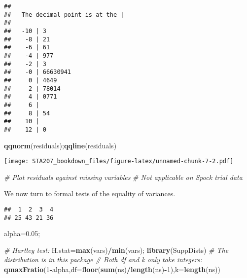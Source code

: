 \documentclass[12pt,]{book}
\newenvironment{Shaded}{\begin{snugshade}}{\end{snugshade}}
\newcommand{\KeywordTok}[1]{\textcolor[rgb]{0.13,0.29,0.53}{\textbf{#1}}}
\newcommand{\DataTypeTok}[1]{\textcolor[rgb]{0.13,0.29,0.53}{#1}}
\newcommand{\DecValTok}[1]{\textcolor[rgb]{0.00,0.00,0.81}{#1}}
\newcommand{\FloatTok}[1]{\textcolor[rgb]{0.00,0.00,0.81}{#1}}
\newcommand{\CommentTok}[1]{\textcolor[rgb]{0.56,0.35,0.01}{\textit{#1}}}
\newcommand{\OperatorTok}[1]{\textcolor[rgb]{0.81,0.36,0.00}{\textbf{#1}}}
\newcommand{\NormalTok}[1]{#1}
\begin{document}
\begin{verbatim}
## 
##   The decimal point is at the |
## 
##   -10 | 3
##    -8 | 21
##    -6 | 61
##    -4 | 977
##    -2 | 3
##    -0 | 66630941
##     0 | 4649
##     2 | 78014
##     4 | 0771
##     6 | 
##     8 | 54
##    10 | 
##    12 | 0
\end{verbatim}

\begin{Shaded}
\begin{Highlighting}[]
\KeywordTok{qqnorm}\NormalTok{(residuals);}\KeywordTok{qqline}\NormalTok{(residuals)}
\end{Highlighting}
\end{Shaded}

\texttt{[image: STA207\_bookdown\_files/figure-latex/unnamed-chunk-7-2.pdf]}

\begin{Shaded}
\begin{Highlighting}[]
\CommentTok{# Plot residuals against missing variables }
\CommentTok{# Not applicable on Spock trial data }
\end{Highlighting}
\end{Shaded}

We now turn to formal tests of the equality of variances.

\begin{Shaded}
\end{Shaded}

\begin{verbatim}
##  1  2  3  4 
## 25 43 21 36
\end{verbatim}

\begin{Shaded}
\begin{Highlighting}[]
\NormalTok{alpha=}\FloatTok{0.05}\NormalTok{;}

\CommentTok{# Hartley test:}
\NormalTok{H.stat=}\KeywordTok{max}\NormalTok{(vars)}\OperatorTok{/}\KeywordTok{min}\NormalTok{(vars);}
\KeywordTok{library}\NormalTok{(SuppDists) }\CommentTok{# The distribution is in this package}
\CommentTok{# Both df and k only take integers:}
\KeywordTok{qmaxFratio}\NormalTok{(}\DecValTok{1}\OperatorTok{-}\NormalTok{alpha,}\DataTypeTok{df=}\KeywordTok{floor}\NormalTok{(}\KeywordTok{sum}\NormalTok{(ns)}\OperatorTok{/}\KeywordTok{length}\NormalTok{(ns)}\OperatorTok{-}\DecValTok{1}\NormalTok{),}\DataTypeTok{k=}\KeywordTok{length}\NormalTok{(ns))}
\end{Highlighting}
\end{Shaded}
\end{document}
